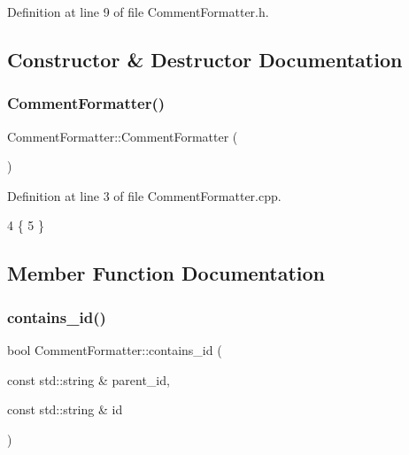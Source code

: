 Definition at line 9 of file Comment\+Formatter.\+h.



\subsection{Constructor \& Destructor Documentation}
\mbox{\label{class_comment_formatter_a2109e1c890568fbc960c06605d30563e}} 
\subsubsection{\texorpdfstring{Comment\+Formatter()}{CommentFormatter()}}
{\footnotesize\ttfamily Comment\+Formatter\+::\+Comment\+Formatter (\begin{DoxyParamCaption}{ }\end{DoxyParamCaption})}



Definition at line 3 of file Comment\+Formatter.\+cpp.


\begin{DoxyCode}
4 \{
5 \}
\end{DoxyCode}


\subsection{Member Function Documentation}
\mbox{\label{class_comment_formatter_a3ee22833399687c24694b6e11a3337ba}} 
\subsubsection{\texorpdfstring{contains\+\_\+id()}{contains\_id()}}
{\footnotesize\ttfamily bool Comment\+Formatter\+::contains\+\_\+id (\begin{DoxyParamCaption}\item[{const std\+::string \&}]{parent\+\_\+id,  }\item[{const std\+::string \&}]{id }\end{DoxyParamCaption})}



